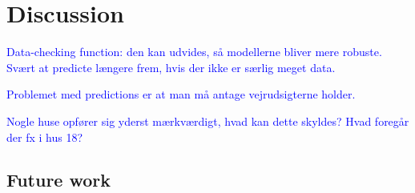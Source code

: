 \chapter{Discussion}

\textcolor{blue}{Data-checking function: den kan udvides, så modellerne bliver mere robuste. Svært at predicte længere frem, hvis der ikke er særlig meget data.} 

\textcolor{blue}{Problemet med predictions er at man må antage vejrudsigterne holder.} 

\textcolor{blue}{Nogle huse opfører sig yderst mærkværdigt, hvad kan dette skyldes? Hvad foregår der fx i hus 18?}

\section{Future work}